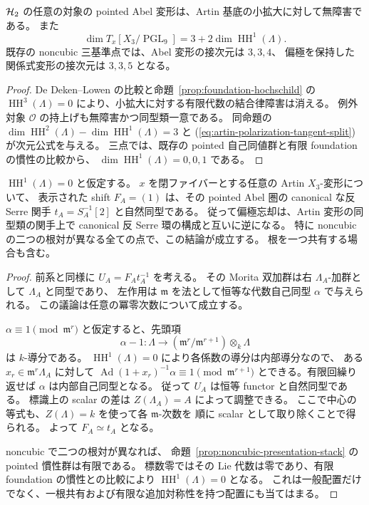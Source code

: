 \begin{corollary}
\label{cor:artin-abelian-unobstructed}
$\mathcal H_2$ の任意の対象の pointed Abel 変形は、Artin 基底の小拡大に対して無障害である。
また
\[
 \dim T_x[X_3/\operatorname{PGL}_9]
 =3+2\dim\operatorname{HH}^{1}(\Lambda).
\]
既存の noncubic 三基準点では、Abel 変形の接次元は $3,3,4$、
偏極を保持した関係式変形の接次元は $3,3,5$ となる。
\end{corollary}
\begin{proof}
De Deken--Lowen の比較と命題~\ref{prop:foundation-hochschild} の
$\operatorname{HH}^{3}(\Lambda)=0$ により、小拡大に対する有限代数の結合律障害は消える。
例外対象 $\mathcal O$ の持上げも無障害かつ同型類一意である。
同命題の $\dim\operatorname{HH}^{2}(\Lambda)-\dim\operatorname{HH}^{1}(\Lambda)=3$ と
(\ref{eq:artin-polarization-tangent-split}) が次元公式を与える。
三点では、既存の pointed 自己同値群と有限 foundation の慣性の比較から、
$\dim\operatorname{HH}^{1}(\Lambda)=0,0,1$ である。
\end{proof}

\begin{corollary}[$\operatorname{HH}^{1}=0$ の点での全 Artin 偏極認識]
\label{cor:artin-rigid-polarization}
$\operatorname{HH}^{1}(\Lambda)=0$ と仮定する。
$x$ を閉ファイバーとする任意の Artin $X_3$-変形について、
表示された shift $F_A=(1)$ は、その pointed Abel 圏の canonical な反 Serre 関手
$t_A=S_A^{-1}[2]$ と自然同型である。
従って偏極忘却は、Artin 変形の同型類の関手上で canonical 反 Serre 環の構成と互いに逆になる。
特に noncubic の二つの根対が異なる全ての点で、この結論が成立する。
根を一つ共有する場合も含む。
\end{corollary}
\begin{proof}
前系と同様に $U_A=F_A t_A^{-1}$ を考える。
その Morita 双加群は右 $\Lambda_A$-加群として $\Lambda_A$ と同型であり、
左作用は $\mathfrak m$ を法として恒等な代数自己同型 $\alpha$ で与えられる。
この議論は任意の冪零次数について成立する。

$\alpha\equiv1\pmod{\mathfrak m^r}$ と仮定すると、先頭項
\[
 \alpha-1:\Lambda\longrightarrow
 (\mathfrak m^r/\mathfrak m^{r+1})\otimes_k\Lambda
\]
は $k$-導分である。
$\operatorname{HH}^{1}(\Lambda)=0$ により各係数の導分は内部導分なので、
ある $x_r\in\mathfrak m^r\Lambda_A$ に対して
$\operatorname{Ad}(1+x_r)^{-1}\alpha\equiv1\pmod{\mathfrak m^{r+1}}$
とできる。有限回繰り返せば $\alpha$ は内部自己同型となる。
従って $U_A$ は恒等 functor と自然同型である。
標識上の scalar の差は $Z(\Lambda_A)=A$ によって調整できる。
ここで中心の等式も、$Z(\Lambda)=k$ を使って各 $\mathfrak m$-次数を
順に scalar として取り除くことで得られる。
よって $F_A\simeq t_A$ となる。

noncubic で二つの根対が異なれば、
命題~\ref{prop:noncubic-presentation-stack} の pointed 慣性群は有限である。
標数零ではその Lie 代数は零であり、有限 foundation の慣性との比較により
$\operatorname{HH}^{1}(\Lambda)=0$ となる。
これは一般配置だけでなく、一根共有および有限な追加対称性を持つ配置にも当てはまる。
\end{proof}

